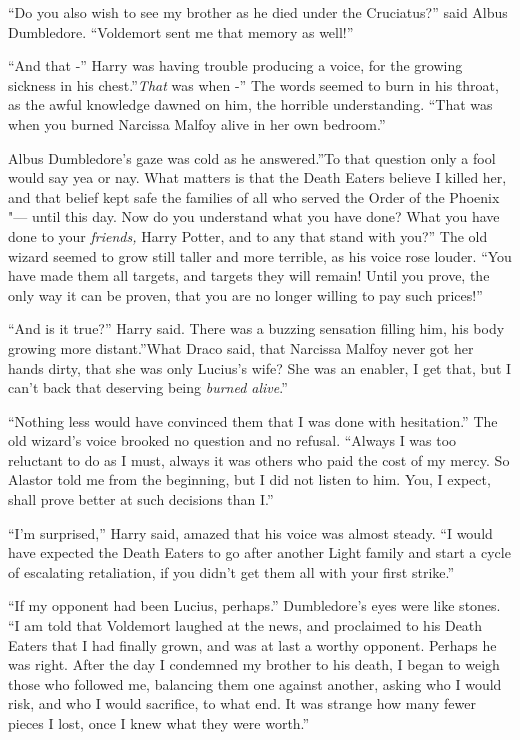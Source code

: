 ``Do you also wish to see my brother as he died under the Cruciatus?''
said Albus Dumbledore. ``Voldemort sent me that memory as well!''

``And that -'' Harry was having trouble producing a voice, for the
growing sickness in his chest.''\emph{That} was when -'' The words
seemed to burn in his throat, as the awful knowledge dawned on him, the
horrible understanding. ``That was when you burned Narcissa Malfoy alive
in her own bedroom.''

Albus Dumbledore's gaze was cold as he answered.''To that question only
a fool would say yea or nay. What matters is that the Death Eaters
believe I killed her, and that belief kept safe the families of all who
served the Order of the Phoenix "--- until this day. Now do you understand
what you have done? What you have done to your \emph{friends,} Harry
Potter, and to any that stand with you?'' The old wizard seemed to grow
still taller and more terrible, as his voice rose louder. ``You have
made them all targets, and targets they will remain! Until you prove,
the only way it can be proven, that you are no longer willing to pay
such prices!''

``And is it true?'' Harry said. There was a buzzing sensation filling
him, his body growing more distant.''What Draco said, that Narcissa
Malfoy never got her hands dirty, that she was only Lucius's wife? She
was an enabler, I get that, but I can't back that deserving being
\emph{burned alive}.''

``Nothing less would have convinced them that I was done with
hesitation.'' The old wizard's voice brooked no question and no refusal.
``Always I was too reluctant to do as I must, always it was others who
paid the cost of my mercy. So Alastor told me from the beginning, but I
did not listen to him. You, I expect, shall prove better at such
decisions than I.''

``I'm surprised,'' Harry said, amazed that his voice was almost steady.
``I would have expected the Death Eaters to go after another Light
family and start a cycle of escalating retaliation, if you didn't get
them all with your first strike.''

``If my opponent had been Lucius, perhaps.'' Dumbledore's eyes were like
stones. ``I am told that Voldemort laughed at the news, and proclaimed
to his Death Eaters that I had finally grown, and was at last a worthy
opponent. Perhaps he was right. After the day I condemned my brother to
his death, I began to weigh those who followed me, balancing them one
against another, asking who I would risk, and who I would sacrifice, to
what end. It was strange how many fewer pieces I lost, once I knew what
they were worth.''


